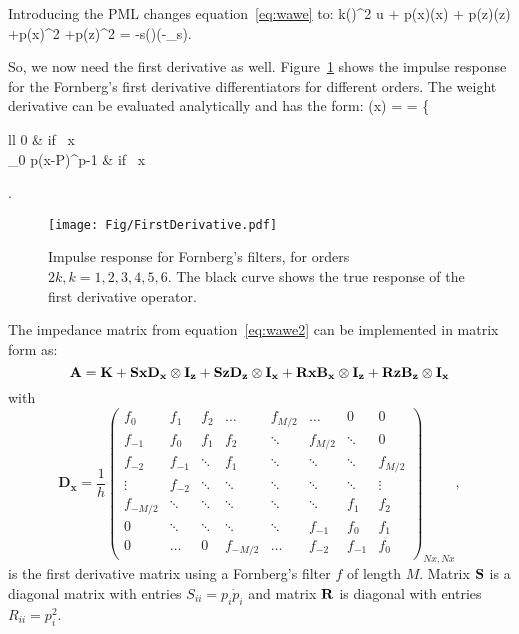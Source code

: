 \documentclass[10pt]{article}
\def\du#1#2{\frac{\partial^{#2} u}{\partial{#1}^{#2}}}
\newcommand{\twopartdef}[4]
{
 \left\{
   \begin{array}{ll}
     #1 & \mbox{if } #2 \\
     #3 & \mbox{if } #4
   \end{array}
 \right.
}
\begin{document}
Introducing the PML changes equation~\ref{eq:wawe} to:
\beq
k(\xx)^2 u + p(x)(x)\du{x}{} + p(z)(z)\du{z}{} +p(x)^2\du{x}{2} +p(z)^2\du{z}{2}  = -s(\omega)\delta(\xx-\xx_s).
  \label{eq:wawe2}
\eeq

So, we now need the first derivative as well. Figure~\ref{fig:d1} shows the impulse response for the Fornberg's first
derivative differentiators for different orders.
The weight derivative can be evaluated analytically and has the form:
\beq
{}(x) =  = \twopartdef{0}{ x \not{}}{\frac{-i}{(1+i\frac{\sigma(x)}{\omega})^2}\sigma_0 p(x-{\partial P})^{p-1}}{x\in {PML}}
\label{eq:waweP}
\eeq
 
\begin{figure}
\centering
\texttt{[image: Fig/FirstDerivative.pdf]}
\caption{Impulse response for Fornberg's filters, for orders $2k, k =1,2,3,4,5,6$. The black curve shows the true
        response of the first derivative operator.}
\label{fig:d1}
\end{figure}

The impedance matrix from equation~\ref{eq:wawe2} can be implemented in matrix form as:
\[
\bf A =\bf K + {\bf Sx} D_x \otimes \bf I_z + {\bf Sz} D_z \otimes \bf I_x +{\bf Rx} B_x \otimes \bf I_z +{\bf Rz} B_z \otimes \bf I_x
\]
with 
\begin{equation}
\mathbf{D_x}=\frac{1}{h}
 \begin{pmatrix}
  f_0     & f_1     &  f_2    & \dots   & f_{M/2} & \dots   & 0      & 0       \\
  f_{-1}  & f_0     &  f_1    & f_2     & \ddots  & f_{M/2} & \ddots & 0       \\
  f_{-2}  & f_{-1}  & \ddots  & f_1     & \ddots  &  \ddots & \ddots & f_{M/2} \\
  \vdots  & f_{-2}  & \ddots  & \ddots  & \ddots  & \ddots  & \ddots & \vdots  \\   
  f_{-M/2}& \ddots  & \ddots  & \ddots  & \ddots  & \ddots  & f_1    & f_2    \\   
  0       & \ddots  & \ddots  & \ddots  & \ddots  & f_{-1}  & f_0    & f_1    \\   
  0       & \dots   & 0       & f_{-M/2}& \dots   & f_{-2}  & f_{-1} & f_0        
 \end{pmatrix}_{Nx,Nx},
\label{eq:D}
\end{equation}
is the first derivative matrix using a Fornberg's filter $f$ of length $M$. Matrix $\bf S$ is a diagonal matrix with entries $S_{ii}= p_i\dot{p}_i$ and 
matrix $\bf R$ is diagonal with entries $ R_{ii} = p_i^2$.
\end{document}
